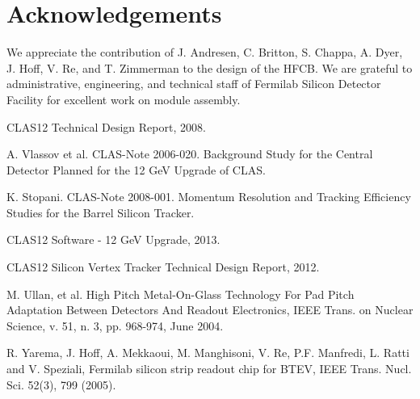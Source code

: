 
\section{Acknowledgements}

We appreciate the contribution of J.  Andresen, C. Britton, S. Chappa, A. Dyer, J. Hoff, V. Re, and T. Zimmerman to the design of the HFCB. We are grateful to administrative, engineering, and technical staff of Fermilab Silicon Detector Facility for excellent work on module assembly.

\begin{thebibliography}{00}

 CLAS12 Technical Design Report, 2008.

 A. Vlassov et al. CLAS-Note 2006-020. Background Study for the Central Detector Planned for the 12 GeV Upgrade of CLAS.

 K. Stopani. CLAS-Note 2008-001. Momentum Resolution and Tracking Efficiency Studies for the Barrel Silicon Tracker.

 CLAS12 Software - 12 GeV Upgrade, 2013.

 CLAS12 Silicon Vertex Tracker Technical Design Report, 2012.

 M. Ullan, et al. High Pitch Metal-On-Glass Technology For Pad Pitch Adaptation Between Detectors And Readout Electronics, IEEE Trans. on Nuclear Science, v. 51, n. 3, pp. 968-974, June 2004.

 R. Yarema, J. Hoff, A. Mekkaoui, M. Manghisoni, V. Re, P.F. Manfredi, L. Ratti and V. Speziali, Fermilab silicon strip readout chip for BTEV, IEEE Trans. Nucl. Sci. 52(3), 799 (2005).

\end{thebibliography}
